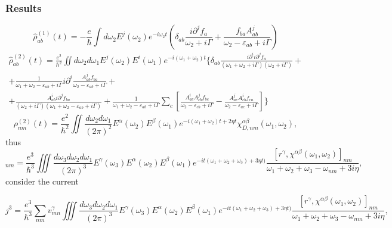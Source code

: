 \documentclass[aps, prb, superscriptaddress, longbibliography]{revtex4-2}
\numberwithin{equation}{section}
\begin{document}
\subsubsection{Results}
\begin{equation}
    \hat\rho^{(1)}_{ab}(t) = -\frac{e}{\hbar}\int d\omega_2E^{j}(\omega_2)e^{-i\omega_2 t}\left(\delta_{ab}\frac{i\partial^jf_a}{\omega_2+i\Gamma}+\frac{f_{ba}A^{j}_{ab}}{\omega_2-\varepsilon_{ab}+i\Gamma}\right)
\end{equation}
\begin{multline}
    \hat{\rho}^{(2)}_{ab}(t)=\frac{e^2}{\hbar^2}\iint d\omega_2d\omega_1E^{j}(\omega_2)E^{i}(\omega_1)e^{-i(\omega_1+\omega_2)t}\Bigg\{
    \delta_{ab}\frac{i\partial^ii\partial^jf_a}{(\omega_1+\omega_2+i\Gamma)(\omega_2+i\Gamma)}+\\+\frac{1}{\omega_1+\omega_2-\varepsilon_{ab}+i\Gamma}i\partial^{i}\frac{A^{j}_{ab}f_{ba}}{\omega_2-\varepsilon_{ab}+i\Gamma}+\\+\frac{A^{i}_{ab}i\partial^jf_{ba}}{(\omega_{2}+i\Gamma)(\omega_1+\omega_2-\varepsilon_{ab}+i\Gamma)}+\frac{1}{\omega_1+\omega_2-\varepsilon_{ab}+i\Gamma}\sum_c\left[\frac{A^i_{ac}A^{j}_{cb}f_{bc}}{\omega_2-\varepsilon_{cb}+i\Gamma}-\frac{A^j_{ac}A^{i}_{cb}f_{ca}}{\omega_2-\varepsilon_{ac}+i\Gamma}\right]\Bigg\}
\end{multline}
\begin{equation}
    \rho^{(2)}_{nm}(t)=\frac{e^2}{\hbar ^2}\iint \frac{d\omega_2d\omega_1}{(2\pi)^2}E^{\alpha}(\omega_2)E^{\beta}(\omega_1)e^{-i(\omega_1+\omega_2)t+2\eta t} \chi_{D,nm}^{\alpha\beta}(\omega_1,\omega_2),
\end{equation}
thus
\begin{equation}
    [\hat\rho_{3}(t)]_{nm} = \frac{e^3}{\hbar ^3}\iiint \frac{d\omega_3d\omega_2d\omega_1}{(2\pi)^3}E^\gamma(\omega_3)E^{\alpha}(\omega_2)E^{\beta}(\omega_1)e^{-it(\omega_1+\omega_2+\omega_3)+3\eta t)} \frac{[{r}^\gamma,\chi^{\alpha\beta}(\omega_1,\omega_2)]_{nm}}{\omega_1+\omega_2+\omega_3-\omega_{nm}+3i\eta},
\end{equation}
consider the current

\begin{equation}
    j^{3} = \frac{e^3}{\hbar ^3}\sum_{nm}v^\gamma_{mn}\iiint \frac{d\omega_3d\omega_2d\omega_1}{(2\pi)^3}E^\gamma(\omega_3)E^{\alpha}(\omega_2)E^{\beta}(\omega_1)e^{-it(\omega_1+\omega_2+\omega_3)+3\eta t)} \frac{[{r}^\gamma,\chi^{\alpha\beta}(\omega_1,\omega_2)]_{nm}}{\omega_1+\omega_2+\omega_3-\omega_{nm}+3i\eta},
\end{equation}
\end{document}
